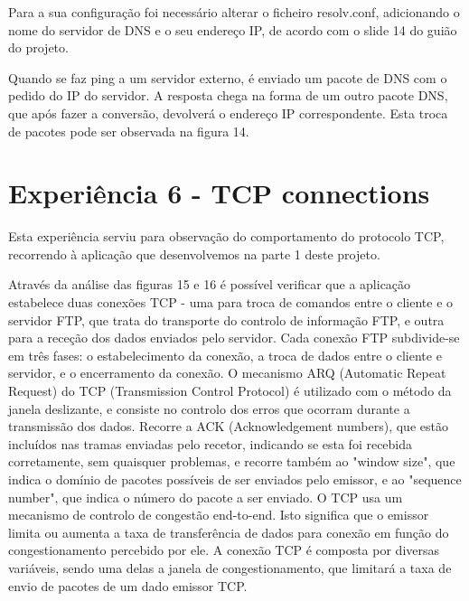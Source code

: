 \documentclass[article, a4paper, 11pt, oneside]{memoir}
\begin{document}
Para a sua configuração foi necessário alterar o ficheiro resolv.conf, adicionando o nome do servidor de DNS e o seu endereço IP, de acordo com o slide 14 do guião do projeto.

Quando se faz ping a um servidor externo, é enviado um pacote de DNS com o pedido do IP do servidor. A resposta chega na forma de um outro pacote DNS, que após fazer a conversão, 
devolverá o endereço IP correspondente.
Esta troca de pacotes pode ser observada na figura 14.

\section{Experiência 6 - TCP connections}

Esta experiência serviu para observação do comportamento do protocolo TCP, 
recorrendo à aplicação que desenvolvemos na parte 1 deste projeto. 

Através da análise das figuras 15 e 16 é possível verificar que a aplicação estabelece duas conexões TCP - uma para troca de comandos entre o cliente e o servidor FTP, 
que trata do transporte do controlo de informação FTP, e outra para a receção dos dados enviados pelo servidor.
Cada conexão FTP subdivide-se em três fases: o estabelecimento da conexão, a troca de dados entre o cliente e servidor, e o encerramento da conexão.
O mecanismo ARQ (Automatic Repeat Request) do TCP (Transmission Control Protocol) é utilizado com o método da janela deslizante, e consiste no controlo dos erros que ocorram durante a transmissão dos dados.
Recorre a ACK (Acknowledgement numbers), que estão incluídos nas tramas enviadas pelo recetor, indicando se esta foi recebida corretamente, sem quaisquer problemas, e recorre também ao "window size", que indica o domínio de pacotes possíveis de ser enviados pelo emissor, e ao "sequence number", que indica o número do pacote a ser enviado.
O TCP usa um mecanismo de controlo de congestão end-to-end. Isto significa que o emissor limita ou aumenta a taxa de transferência de dados para conexão em função do congestionamento percebido por ele.
A conexão TCP é composta por diversas variáveis, sendo uma delas a janela de congestionamento, que limitará a taxa de envio de pacotes de um dado emissor TCP.
\end{document}
